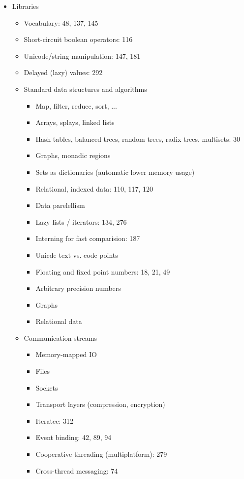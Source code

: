 \begin{itemize}
\begin{itemize}
\begin{itemize}
    \end{itemize}
  \end{itemize}
\item Libraries
  \begin{itemize}
  \item Vocabulary: 48, 137, 145
  \item Short-circuit boolean operators: 116
  \item Unicode/string manipulation: 147, 181
  \item Delayed (lazy) values: 292
  \item Standard data structures and algorithms
    \begin{itemize}
    \item Map, filter, reduce, sort, ...
    \item Arrays, splays, linked lists
    \item Hash tables, balanced trees, random trees, radix trees, multisets: 30
    \item Graphs, monadic regions
    \item Sets as dictionaries (automatic lower memory usage)
    \item Relational, indexed data: 110, 117, 120
    \item Data parelellism
    \item Lazy lists / iterators: 134, 276
    \item Interning for fast comparision: 187
    \item Unicde text vs. code points
    \item Floating and fixed point numbers: 18, 21, 49
    \item Arbitrary precision numbers
    \item Graphs
    \item Relational data
    \end{itemize}
  \item Communication streams
    \begin{itemize}
    \item Memory-mapped IO
    \item Files
    \item Sockets
    \item Transport layers (compression, encryption)
    \item Iteratee: 312
    \item Event binding: 42, 89, 94
    \item Cooperative threading (multiplatform): 279
    \item Cross-thread messaging: 74

\end{itemize}
\end{itemize}
\end{itemize}
